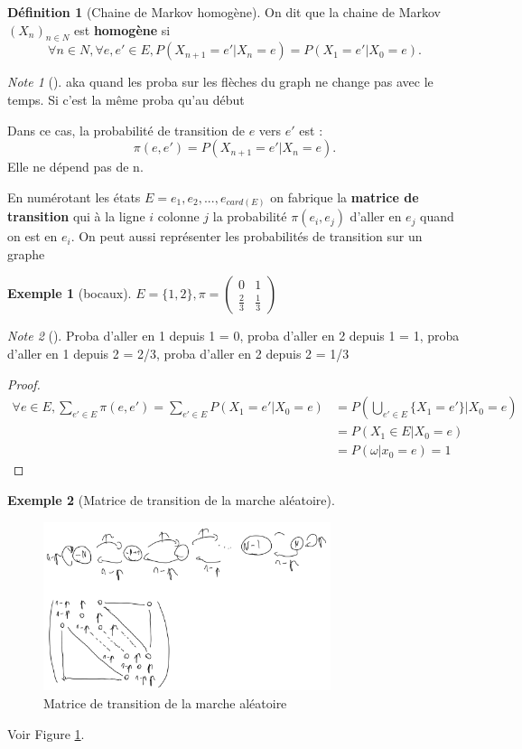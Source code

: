 \documentclass{article}
\theoremstyle{plain}%
\theoremstyle{definition}
\newtheorem{defn}{Définition}[section]
\newtheorem{exmp}{Exemple}[section]
\theoremstyle{remark}
\newtheorem*{note}{Note}
\begin{document}
	\begin{defn}[Chaine de Markov homogène]
		On dit que la chaine de Markov $ (X_n)_{n \in N} $ est \textbf{homogène} si 
		\[
			\forall n \in N, \forall e,e' \in  E, P(X_{n+1} = e' | X_n = e) = P(X_1 = e' | X_0 = e)
		.\]

		\begin{note}[]
			aka quand les proba sur les flèches du graph ne change pas avec le temps. Si c'est la même proba qu'au début
		\end{note}
		
		Dans ce cas, la probabilité de transition de $ e $ vers $ e' $ est : 
		\[
			\pi (e,e') = P(X_{n+1} = e' | X_n = e) 
		.\]
		Elle ne dépend pas de n. 

		En numérotant les états $ E = {e_1, e_2, ..., e_{card(E)}} $ on fabrique la \textbf{matrice de transition} qui à la ligne $ i $  colonne $ j $  la probabilité $ \pi (e_i,e_j) $ d'aller en $ e_j $ quand on est en $ e_i $. On peut aussi représenter les probabilités de transition sur un graphe
	\end{defn}

	\begin{exmp}[bocaux]
		$ E=\{1,2\}, \pi =  
		\begin{pmatrix}
			0 & 1 \\
			\frac{2}{3} & \frac{1}{3}
		\end{pmatrix}$
		\begin{note}[]
			Proba d'aller en 1 depuis 1 = 0, proba d'aller en 2 depuis 1 = 1, proba d'aller en 1 depuis 2 = 2/3, proba d'aller en 2 depuis 2 = 1/3
		\end{note}
	
		\begin{proof}
			\begin{align*}
				\forall e \in E, \sum_{e' \in E}^{} \pi (e, e') = \sum_{e' \in E}^{} P(X_1 = e' | X_0 = e) &= P(\bigcup_{e' \in E} \{X_1=e'\} | X_0 = e) \\
				&= P(X_1 \in E | X_0 = e) \\
				&= P(\omega | x_0 = e ) = 1 
			\end{align*}
		\end{proof}
	\end{exmp}
	\begin{exmp}[Matrice de transition de la marche aléatoire]
		\begin{figure}[!htbp]
			\centering
			\includegraphics[width=0.75\textwidth]{./figures_chap1/figure3.png}
			\caption{Matrice de transition de la marche aléatoire}
			\label{graph1}
		\end{figure}
		Voir Figure \ref{graph1}.
	\end{exmp}
\end{document}
